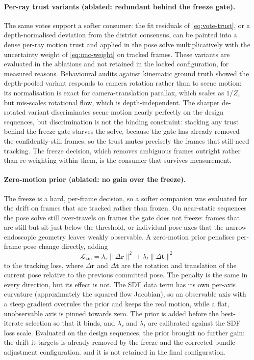 \documentclass{article}
\begin{document}
\paragraph{Per-ray trust variants (ablated: redundant behind the freeze gate).} The same votes support a softer consumer: the fit residuals of \eqref{eq:vote-trust}, or a depth-normalised deviation from the district consensus, can be painted into a dense per-ray motion trust and applied in the pose solve multiplicatively with the uncertainty weight of \eqref{eq:unc-weight} on tracked frames. These variants are evaluated in the ablations and not retained in the locked configuration, for measured reasons. Behavioural audits against kinematic ground truth showed the depth-pooled variant responds to camera rotation rather than to scene motion: its normalisation is exact for camera-translation parallax, which scales as $1/Z$, but mis-scales rotational flow, which is depth-independent. The sharper de-rotated variant discriminates scene motion nearly perfectly on the design sequences, but discrimination is not the binding constraint: stacking any trust behind the freeze gate starves the solve, because the gate has already removed the confidently-still frames, so the trust mutes precisely the frames that still need tracking. The freeze decision, which removes ambiguous frames outright rather than re-weighting within them, is the consumer that survives measurement.

\paragraph{Zero-motion prior (ablated: no gain over the freeze).} The freeze is a hard, per-frame decision, so a softer companion was evaluated for the drift on frames that are tracked rather than frozen. On near-static sequences the pose solve still over-travels on frames the gate does not freeze: frames that are still but sit just below the threshold, or individual pose axes that the narrow endoscopic geometry leaves weakly observable. A zero-motion prior penalises per-frame pose change directly, adding
\begin{equation}
    \mathcal{L}_{\text{zm}} = \lambda_r \lVert \Delta\mathbf{r} \rVert^2 + \lambda_t \lVert \Delta\mathbf{t} \rVert^2
    \label{eq:zeromotion}
\end{equation}
to the tracking loss, where $\Delta\mathbf{r}$ and $\Delta\mathbf{t}$ are the rotation and translation of the current pose relative to the previous committed pose. The penalty is the same in every direction, but its effect is not. The SDF data term has its own per-axis curvature (approximately the squared flow Jacobian), so an observable axis with a steep gradient overrules the prior and keeps the real motion, while a flat, unobservable axis is pinned towards zero. The prior is added before the best-iterate selection so that it binds, and $\lambda_r$ and $\lambda_t$ are calibrated against the SDF loss scale. Evaluated on the design sequences, the prior brought no further gain: the drift it targets is already removed by the freeze and the corrected bundle-adjustment configuration, and it is not retained in the final configuration.
\end{document}
